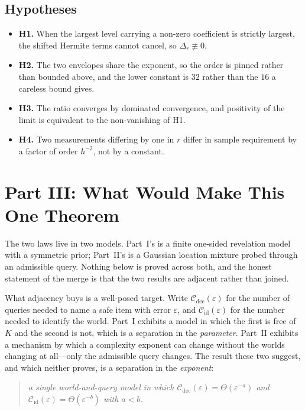 \subsection{Hypotheses}

\begin{itemize}
\item \textbf{H1.} When the largest level carrying a non-zero coefficient is strictly
largest, the shifted Hermite terms cannot cancel, so $\Delta_{r}\not\equiv0$.
\item \textbf{H2.} The two envelopes share the exponent, so the order is pinned rather than
bounded above, and the lower constant is $32$ rather than the $16$ a careless bound gives.
\item \textbf{H3.} The ratio converges by dominated convergence, and positivity of the limit
is equivalent to the non-vanishing of H1.
\item \textbf{H4.} Two measurements differing by one in $r$ differ in sample requirement by a
factor of order $h^{-2}$, not by a constant.
\end{itemize}


\section{Part III: What Would Make This One Theorem}
\label{sec:sq-bridge}

The two laws live in two models. Part~I's is a finite one-sided revelation model with a
symmetric prior; Part~II's is a Gaussian location mixture probed through an admissible query.
Nothing below is proved across both, and the honest statement of the merge is that the two
results are adjacent rather than joined.

What adjacency buys is a well-posed target. Write $\mathcal{C}_{\mathrm{dec}}(\varepsilon)$
for the number of queries needed to name a safe item with error $\varepsilon$, and
$\mathcal{C}_{\mathrm{id}}(\varepsilon)$ for the number needed to identify the world. Part~I
exhibits a model in which the first is free of $K$ and the second is not, which is a
separation in the \emph{parameter}. Part~II exhibits a mechanism by which a complexity
exponent can change without the worlds changing at all---only the admissible query changes.
The result these two suggest, and which neither proves, is a separation in the
\emph{exponent}:

\begin{quote}
\emph{a single world-and-query model in which
$\mathcal{C}_{\mathrm{dec}}(\varepsilon)=\Theta(\varepsilon^{-a})$ and
$\mathcal{C}_{\mathrm{id}}(\varepsilon)=\Theta(\varepsilon^{-b})$ with $a<b$.}
\end{quote}

